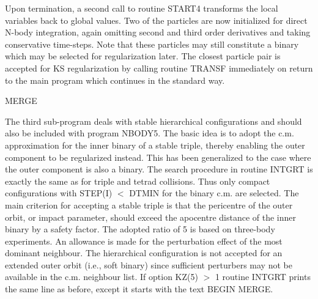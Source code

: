  Upon termination, a second call to routine START4 transforms the local variables back to global                 
   values.  Two of the particles are now initialized for direct N-body integration, again omitting                      
   second and third order derivatives and taking conservative time-steps.  Note that these particles may                
   still constitute a binary which may be selected for regularization later.  The closest particle pair                 
   is accepted for KS regularization by calling routine TRANSF immediately on return to the main program                
   which continues in the standard way.                                                                                 
\bigskip
\bigskip
\centerline {MERGE}
\bigskip
 The third sub-program deals with stable hierarchical configurations and should also be included                 
   with program NBODY5.  The basic idea is to adopt the c.m. approximation for                     
  the inner binary of a stable triple,
   thereby enabling the outer component to be regularized instead.  This has been                        
   generalized to the case where the outer component is also a binary.  The                    
   search procedure in routine INTGRT is exactly the same as for triple and tetrad collisions.  Thus                    
   only compact configurations with STEP(I) $<$ DTMIN for the binary c.m. are selected.  The main                         
   criterion for accepting a stable triple is that the pericentre of the outer orbit, or impact                         
   parameter, should exceed the apocentre distance of the inner binary by a safety factor.  The adopted                 
   ratio of 5 is based on three-body experiments.  An allowance is made for the perturbation effect of                  
   the most dominant neighbour.  The hierarchical configuration is not accepted for an extended outer                   
   orbit (i.e., soft binary)
   since sufficient perturbers may not be available in the c.m. neighbour list.  If option KZ(5) $>$                
   1 routine INTGRT prints the same line as before, except it starts with the text BEGIN MERGE.                         

